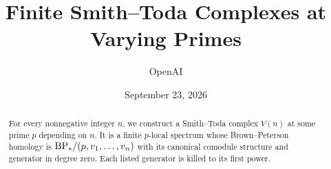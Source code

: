 \documentclass[11pt]{article}
\title{Finite Smith--Toda Complexes at Varying Primes}
\author{OpenAI}
\date{September 23, 2026}
\begin{document}
\maketitle
\begin{abstract}
For every nonnegative integer $n$, we construct a Smith--Toda complex
$V(n)$ at some prime $p$ depending on $n$. It is a finite $p$-local
spectrum whose Brown--Peterson homology is
$\mathrm{BP}_*/(p,v_1,\ldots,v_n)$ with its canonical comodule structure and
generator in degree zero. Each listed generator is killed to its first
power.
\end{abstract}
\tableofcontents











\end{document}

